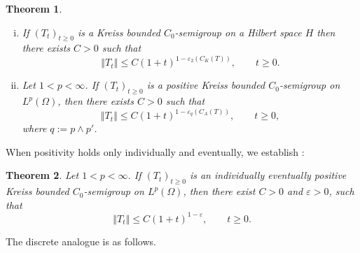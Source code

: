 \documentclass[12pt]{amsart}
\theoremstyle{plain}
\newtheorem{thm}{Theorem}[section]
\theoremstyle{remark}
\theoremstyle{definition}
\newcommand{\norm}[1]{\left\Vert #1\right\Vert}
\begin{document}
	\begin{thm}\label{thmContinuousMain}
		
		\begin{enumerate}[(i)]
			\item
			If $(T_t)_{t\ge 0}$ is a Kreiss bounded $C_0$-semigroup on a Hilbert space $H$ then there exists $C>0$ such that
			\begin{equation}\label{eqMainHilbertContinuous}
				\norm{T_t}
				\le
				C(1+t)^{1-\varepsilon_2(C_K(T))},
				\qquad t\ge 0.
			\end{equation}
			
			\item
			Let $1<p<\infty$. If $(T_t)_{t\ge 0}$ is a positive Kreiss bounded $C_0$-semigroup on $L^p(\Omega)$, then there exists $C>0$ such that
			\begin{equation*}\label{eqMainPositiveContinuous}
				\norm{T_t}
				\le
				C(1+t)^{1-\varepsilon_q(C_A(T))},
				\qquad t\ge 0,
			\end{equation*}
			where $q:=p\wedge p'$.
		\end{enumerate}
	\end{thm}
	
	When positivity holds only individually and eventually, we establish : 
	\begin{thm}\label{thmIndEv}
		Let $1<p<\infty$. If $(T_t)_{t\ge 0}$ is an individually eventually positive Kreiss bounded $C_0$-semigroup on $L^p(\Omega)$, then there exist $C>0$ and $\varepsilon >0$, such that
		\begin{equation*}\label{eqMainindPositiveContinuous}
			\norm{T_t}
			\le
			C(1+t)^{1-\varepsilon},
			\qquad t\ge 0.
		\end{equation*}
		
		
		
		
	\end{thm}
	
	The discrete analogue is as follows.
	
\end{document}

